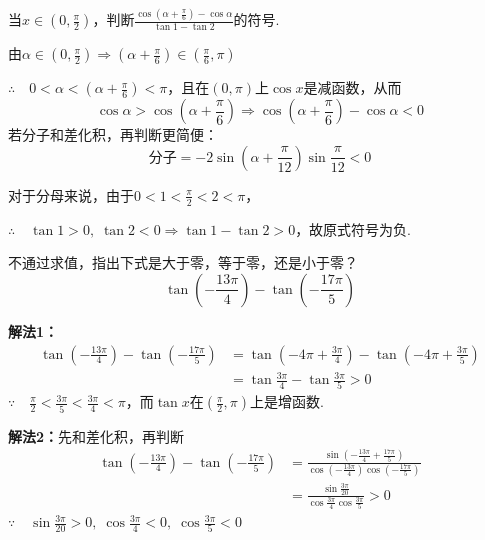 \begin{example}
当$x\in\left(0,\frac{\pi}{2}\right)$，判断$\frac{\cos\left(\alpha+\frac{\pi}{6}\right)-\cos \alpha}{\tan 1-\tan 2}$的符号.
\end{example}

\begin{solution}
由$\alpha\in\left(0,\frac{\pi}{2}\right)\Rightarrow \left(\alpha+\frac{\pi}{6}\right)\in \left(\frac{\pi}{6},\pi\right)$

$\therefore\quad 0<\alpha<\left(\alpha+\frac{\pi}{6}\right)<\pi$，且在$(0,\pi)$上$\cos x$是减函数，从而
\[\cos\alpha>\cos\left(\alpha+\frac{\pi}{6}\right) \Longrightarrow \cos\left(\alpha+\frac{\pi}{6}\right)-\cos\alpha<0\]
若分子和差化积，再判断更简便：
\[\text{分子}=-2\sin\left(\alpha+\frac{\pi}{12}\right)\sin\frac{\pi}{12}<0\]

对于分母来说，由于$0<1<\frac{\pi}{2}<2<\pi$，

$\therefore\quad \tan 1>0,\; \tan 2<0 \Rightarrow \tan1-\tan 2>0$，故原式符号为负.
\end{solution}

\begin{example}
不通过求值，指出下式是大于零，等于零，还是小于零？
\[\tan\left(-\frac{13\pi}{4}\right)-\tan\left(-\frac{17\pi}{5}\right)\]
\end{example}


\begin{solution}
\textbf{解法1：}
\[\begin{split}
    \tan\left(-\frac{13\pi}{4}\right)-\tan\left(-\frac{17\pi}{5}\right)&=\tan\left(-4\pi+\frac{3\pi}{4}\right)-\tan\left(-4\pi+\frac{3\pi}{5}\right)\\
    &=\tan\frac{3\pi}{4}-\tan\frac{3\pi}{5}>0
\end{split}\]
$\because\quad \frac{\pi}{2}<\frac{3\pi}{5}<\frac{3\pi}{4}<\pi$，而$\tan x$在$\left(\frac{\pi}{2},\pi\right)$上是增函数.

\textbf{解法2：}先和差化积，再判断
\[\begin{split}
    \tan\left(-\frac{13\pi}{4}\right)-\tan\left(-\frac{17\pi}{5}\right)&=\frac{\sin\left(-\frac{13\pi}{4}+\frac{17\pi}{5}\right)}{\cos\left(-\frac{13\pi}{4}\right)\cos\left(-\frac{17\pi}{5}\right)}\\
    &=\frac{\sin\frac{3\pi}{20}}{\cos\frac{3\pi}{4}\cos\frac{3\pi}{5}}>0
\end{split}\]
$\because\quad \sin\frac{3\pi}{20}>0,\; \cos\frac{3\pi}{4}<0,\; \cos\frac{3\pi}{5}<0$
\end{solution}

